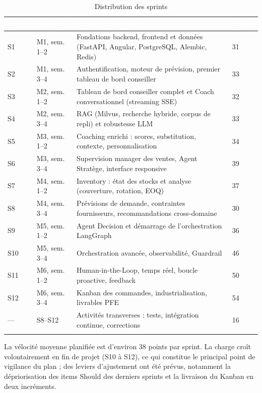 \begin{longtable}{|P{1.2cm}|P{2.2cm}|P{7.6cm}|P{1.4cm}|}
\hline
{}
\textcolor{white}{\textbf{Sprint}} &
\textcolor{white}{\textbf{Période}} &
\textcolor{white}{\textbf{Objectif de sprint}} &
\textcolor{white}{\textbf{Points}} \\
\hline
\endhead
\hline
\endfoot
\hline
\endlastfoot
S1 & M1, sem. 1--2 & Fondations backend, frontend et données (FastAPI, Angular, PostgreSQL, Alembic, Redis) & 31 \\
\hline
S2 & M1, sem. 3--4 & Authentification, moteur de prévision, premier tableau de bord conseiller & 33 \\
\hline
S3 & M2, sem. 1--2 & Tableau de bord conseiller complet et Coach conversationnel (streaming SSE) & 32 \\
\hline
S4 & M2, sem. 3--4 & RAG (Milvus, recherche hybride, corpus de repli) et robustesse LLM & 33 \\
\hline
S5 & M3, sem. 1--2 & Coaching enrichi : scores, substitution, contexte, personnalisation & 34 \\
\hline
S6 & M3, sem. 3--4 & Supervision manager des ventes, Agent Stratège, interface responsive & 39 \\
\hline
S7 & M4, sem. 1--2 & Inventory : état des stocks et analyse (couverture, rotation, EOQ) & 37 \\
\hline
S8 & M4, sem. 3--4 & Prévisions de demande, contraintes fournisseurs, recommandations cross-domaine & 30 \\
\hline
S9 & M5, sem. 1--2 & Agent Decision et démarrage de l'orchestration LangGraph & 36 \\
\hline
S10 & M5, sem. 3--4 & Orchestration avancée, observabilité, Guardrail & 46 \\
\hline
S11 & M6, sem. 1--2 & Human-in-the-Loop, temps réel, boucle proactive, feedback & 50 \\
\hline
S12 & M6, sem. 3--4 & Kanban des commandes, industrialisation, livrables PFE & 54 \\
\hline
--- & S8--S12 & Activités transverses : tests, intégration continue, corrections & 16 \\
\hline
\caption{Distribution des sprints}
\label{tab:sprints-chap2}
\end{longtable}

La vélocité moyenne planifiée est d'environ 38 points par sprint. La charge croît volontairement en fin de projet (S10 à S12), ce qui constitue le principal point de vigilance du plan ; des leviers d'ajustement ont été prévus, notamment la dépriorisation des items Should des derniers sprints et la livraison du Kanban en deux incréments.

